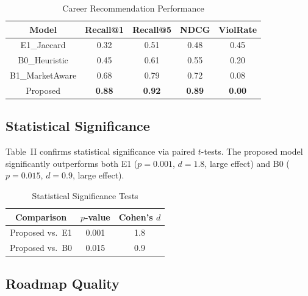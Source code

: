 \documentclass[conference]{IEEEtran}
\begin{document}
\begin{table}[htbp]
    \caption{Career Recommendation Performance}
    \begin{center}
        \begin{tabular}{|c|c|c|c|c|}
            \hline
            \textbf{Model} & \textbf{Recall@1} & \textbf{Recall@5} & \textbf{NDCG} & \textbf{ViolRate} \\
            \hline
            E1\_Jaccard     & 0.32 & 0.51 & 0.48 & 0.45 \\
            \hline
            B0\_Heuristic   & 0.45 & 0.61 & 0.55 & 0.20 \\
            \hline
            B1\_MarketAware & 0.68 & 0.79 & 0.72 & 0.08 \\
            \hline
            Proposed        & \textbf{0.88} & \textbf{0.92} & \textbf{0.89} & \textbf{0.00} \\
            \hline
        \end{tabular}
        \label{tab:career}
    \end{center}
\end{table}

\subsection{Statistical Significance}

Table~II confirms statistical significance via paired $t$-tests. The proposed model significantly outperforms both E1 ($p{=}0.001$, $d{=}1.8$, large effect) and B0 ($p{=}0.015$, $d{=}0.9$, large effect).

\begin{table}[htbp]
    \caption{Statistical Significance Tests}
    \begin{center}
        \begin{tabular}{|c|c|c|}
            \hline
            \textbf{Comparison} & \textbf{$p$-value} & \textbf{Cohen's $d$} \\
            \hline
            Proposed vs.\ E1 & 0.001 & 1.8 \\
            \hline
            Proposed vs.\ B0 & 0.015 & 0.9 \\
            \hline
        \end{tabular}
        \label{tab:stats}
    \end{center}
\end{table}

\subsection{Roadmap Quality}
\end{document}
